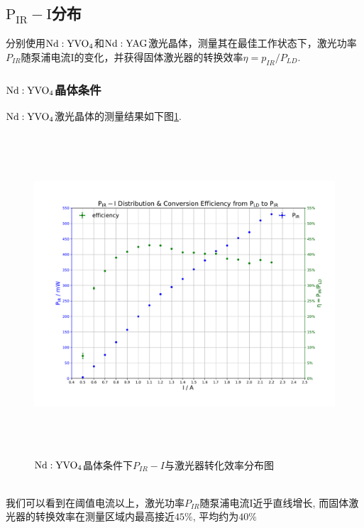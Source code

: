 \documentclass[a4paper]{article}
\begin{document}
\subsection{$\mathrm{P_{IR} - I}$分布}\label{sub:ctl}
分别使用$\rm Nd:YVO_4$和$\rm Nd:YAG$激光晶体，测量其在最佳工作状态下，激光功率$P_{IR}$随泵浦电流I的变化，并获得固体激光器的转换效率$\eta = p_{IR}/P_{LD}$.
\subsubsection{$\rm{Nd:YVO_4}$晶体条件}
$\rm Nd:YVO_4$激光晶体的测量结果如下图\ref{fig:fig2}. 
\begin{figure}[ht]
 \centering
 \includegraphics[height=12cm, width=16cm]{images/phyex2_fig.pdf}
 \caption{$\rm{Nd:YVO_4}$晶体条件下$P_{IR}-I$与激光器转化效率分布图}
 \label{fig:fig2}
\end{figure}\\
我们可以看到在阈值电流以上，激光功率$P_{IR}$随泵浦电流I近乎直线增长, 而固体激光器的转换效率在测量区域内最高接近$45\%$, 平均约为$40\%$
\newpage
\end{document}
